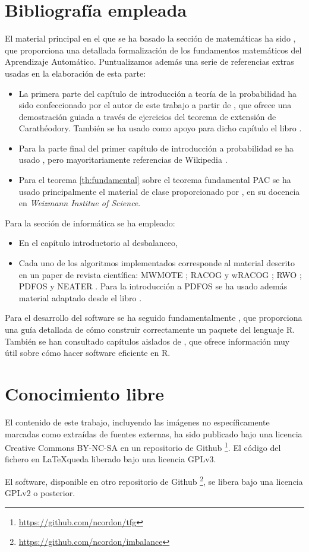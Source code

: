 \section{Bibliografía empleada}
El material principal en el que se ha basado la sección de matemáticas ha sido \citep{shalev}, 
que proporciona una detallada formalización de los fundamentos matemáticos del Aprendizaje Automático. Puntualizamos además
una serie de referencias extras usadas en la elaboración de esta parte:

\begin{itemize} 
 \item La primera parte del capítulo de introducción a teoría de la probabilidad ha sido confeccionado por el autor de 
 este trabajo a partir de \citep{caratheodory}, que ofrece una demostración guiada a través de ejercicios del teorema de extensión
 de Carathéodory. También se ha usado como apoyo para dicho capítulo el libro \citep{loeve}. 
 \item Para la parte final del primer capítulo de introducción a probabilidad se ha usado \citep{shalev}, pero
 mayoritariamente referencias de Wikipedia \citep{wiki:markov, wiki:hoeff_lemma, wiki:hoeffding}.
 \item Para el teorema \ref{th:fundamental} sobre el teorema fundamental PAC se ha usado principalmente el material de clase
 proporcionado por \citep{slfetaya}, en su docencia en \textit{Weizmann Institue of Science}.
\end{itemize}
 
 Para la sección de informática se ha empleado:
 
\begin{itemize}
 \item En el capítulo introductorio al desbalanceo, \citep{he2009} 
 \item Cada uno de los algoritmos implementados corresponde al material descrito en un paper de revista científica: 
 MWMOTE \citep{barua14}; RACOG y wRACOG \citep{das2015}; RWO \citep{zhang2014}; PDFOS \citep{gao2014} y 
 NEATER \citep{almogahed2014}. Para la introducción a PDFOS se ha usado además material adaptado desde el libro \citep{silverman}.
\end{itemize}

 Para el desarrollo del software se ha seguido fundamentalmente \citep{rhadleypkg}, que proporciona una guía detallada de
 cómo construir correctamente un paquete del lenguaje R. También se han consultado capítulos aislados de \citep{rgillespie},
 que ofrece información muy útil sobre cómo hacer software eficiente en R.
 
\section{Conocimiento libre}
 El contenido de este trabajo, incluyendo las imágenes no específicamente marcadas como extraídas de fuentes externas,
 ha sido publicado bajo una licencia Creative Commons BY-NC-SA en un repositorio de Github 
 \footnote{\url{https://github.com/ncordon/tfg}}. El código del fichero en \LaTeX queda liberado bajo una licencia GPLv3.
 
 El software, disponible en otro repositorio de Github \footnote{\url{https://github.com/ncordon/imbalance}}, se libera bajo
 una licencia GPLv2 o posterior.